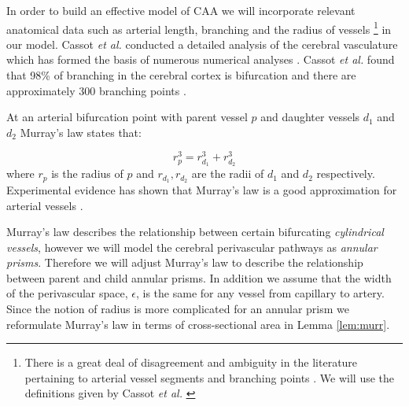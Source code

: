 \documentclass[10pt]{amsart} %
\theoremstyle{definition}
\begin{document}
In order to build an effective model of CAA we will incorporate relevant anatomical data such as arterial length, branching and the radius of vessels \footnote{  There is  a great deal of disagreement and ambiguity in the literature pertaining to arterial vessel segments and branching points \cite{Zamir}.  We will use the definitions given by Cassot \emph{et al.} \cite{Cassot}} in our model.
Cassot \emph{et al.} conducted a detailed analysis of the cerebral vasculature which has formed the basis of numerous numerical analyses \cite{grinberg,francis,risser}. Cassot \emph{et al.} found that 98\% of branching in the cerebral cortex is bifurcation and there are approximately  300 branching points \cite{Cassot}. 


At an arterial bifurcation point with parent vessel $p$ and daughter vessels $d_{1}$ and $d_2$ Murray's law \cite{Murray} states that:

\[r_{p}^{3} = r_{d_{1}}^{3} + r_{d_{2}}^{3}\]
where $r_{p}$ is the radius of $p$ and $r_{d_{1}},r_{d_{2}}$ are the radii of $d_{1}$ and 
$d_{2}$ respectively.
Experimental evidence has shown that Murray's law is a good approximation for 
arterial vessels \cite{Zamir,cohn}.

Murray's law describes the relationship between certain bifurcating  
\emph{cylindrical vessels}, however we will model the cerebral perivascular pathways as \emph{annular prisms}.  Therefore we will adjust Murray's law to describe 
the relationship between parent and child annular prisms. In addition we assume that the width of the perivascular space, $\epsilon$, is the same for any vessel from capillary to
 artery. Since the notion of radius is more 
complicated for an annular prism we reformulate Murray's law in terms of 
cross-sectional area in Lemma \ref{lem:murr}.   




\end{document}
